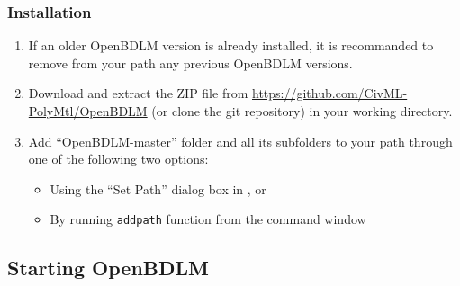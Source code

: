 \subsubsection{Installation}
\begin{enumerate}
\item If an older OpenBDLM version is already installed, it is recommanded to remove from your \MATLAB{} path any previous OpenBDLM versions.
\item Download and extract the ZIP file from \url{https://github.com/CivML-PolyMtl/OpenBDLM} (or clone the git repository) in your working directory.
\item Add ``OpenBDLM-master'' folder and all its subfolders to your \MATLAB{}  path through one of the following two options:
\begin{itemize}
    \item Using the ``Set Path'' dialog box in \MATLAB{}, or 
    \item By running  \lstinline[basicstyle = \mlttfamily \small, backgroundcolor = \color{light-gray}]!addpath! function from the \MATLAB{} command window
    \end{itemize}
\end{enumerate}


\subsection{Starting OpenBDLM}
\label{S:OPENBDLMGETTINGSTARTED}

